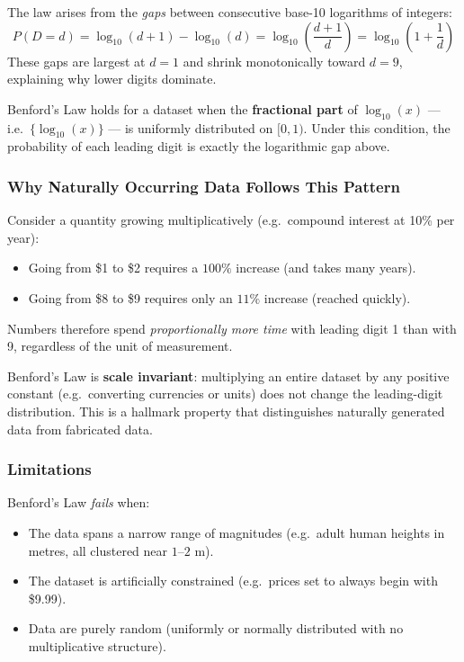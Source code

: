 The law arises from the \emph{gaps} between consecutive base-10 logarithms of integers:
\[
P(D = d) = \log_{10}(d+1) - \log_{10}(d) = \log_{10}\!\left(\frac{d+1}{d}\right) = \log_{10}\!\left(1+\frac{1}{d}\right)
\]
These gaps are largest at $d=1$ and shrink monotonically toward $d=9$, explaining why lower digits dominate.

\begin{theorem}
Benford's Law holds for a dataset when the \textbf{fractional part} of $\log_{10}(x)$ --- i.e.\ $\{\log_{10}(x)\}$ --- is uniformly distributed on $[0,1)$. Under this condition, the probability of each leading digit is exactly the logarithmic gap above.
\end{theorem}

\subsubsection*{Why Naturally Occurring Data Follows This Pattern}

Consider a quantity growing multiplicatively (e.g.\ compound interest at 10\% per year):
\begin{itemize}
    \item Going from \$1 to \$2 requires a $100\%$ increase (and takes many years).
    \item Going from \$8 to \$9 requires only an $11\%$ increase (reached quickly).
\end{itemize}
Numbers therefore spend \emph{proportionally more time} with leading digit 1 than with 9, regardless of the unit of measurement.

\begin{theorem}
Benford's Law is \textbf{scale invariant}: multiplying an entire dataset by any positive constant (e.g.\ converting currencies or units) does not change the leading-digit distribution. This is a hallmark property that distinguishes naturally generated data from fabricated data.
\end{theorem}

\subsubsection*{Limitations}

Benford's Law \emph{fails} when:
\begin{itemize}
    \item The data spans a narrow range of magnitudes (e.g.\ adult human heights in metres, all clustered near $1$--$2$ m).
    \item The dataset is artificially constrained (e.g.\ prices set to always begin with \$9.99).
    \item Data are purely random (uniformly or normally distributed with no multiplicative structure).
\end{itemize}


